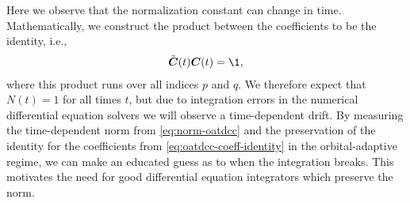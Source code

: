             Here we observe that the normalization constant can change in time.
            Mathematically, we construct the product between the coefficients to
            be the identity, i.e.,
            \begin{align}
                \tilde{\vfg{C}}(t)\vfg{C}(t)
                = \1,
                \label{eq:oatdcc-coeff-identity}
            \end{align}
            where this product runs over all indices $p$ and $q$.
            We therefore expect that $N(t) = 1$ for all times $t$, but due to
            integration errors in the numerical differential equation solvers we
            will observe a time-dependent drift.
            By measuring the time-dependent norm from \autoref{eq:norm-oatdcc}
            and the preservation of the identity for the coefficients from
            \autoref{eq:oatdcc-coeff-identity} in the orbital-adaptive regime,
            we can make an educated guess as to when the integration breaks.
            This motivates the need for good differential equation integrators
            which preserve the norm.

